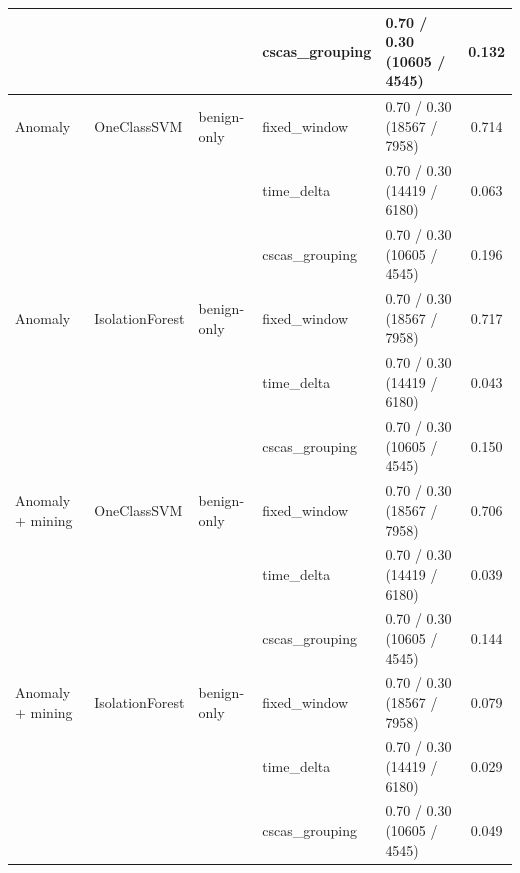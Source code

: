 \begin{table}[htbp]
{\begin{tabular}{lllllc}
 &  &  & cscas\_grouping & 0.70 / 0.30 (10605 / 4545) & 0.132 \\
\midrule
Anomaly & OneClassSVM & benign-only & fixed\_window & 0.70 / 0.30 (18567 / 7958) & 0.714 \\
 &  &  & time\_delta & 0.70 / 0.30 (14419 / 6180) & 0.063 \\
 &  &  & cscas\_grouping & 0.70 / 0.30 (10605 / 4545) & 0.196 \\
\addlinespace
Anomaly & IsolationForest & benign-only & fixed\_window & 0.70 / 0.30 (18567 / 7958) & 0.717 \\
 &  &  & time\_delta & 0.70 / 0.30 (14419 / 6180) & 0.043 \\
 &  &  & cscas\_grouping & 0.70 / 0.30 (10605 / 4545) & 0.150 \\
\addlinespace
Anomaly + mining & OneClassSVM & benign-only & fixed\_window & 0.70 / 0.30 (18567 / 7958) & 0.706 \\
 &  &  & time\_delta & 0.70 / 0.30 (14419 / 6180) & 0.039 \\
 &  &  & cscas\_grouping & 0.70 / 0.30 (10605 / 4545) & 0.144 \\
\addlinespace
Anomaly + mining & IsolationForest & benign-only & fixed\_window & 0.70 / 0.30 (18567 / 7958) & 0.079 \\
 &  &  & time\_delta & 0.70 / 0.30 (14419 / 6180) & 0.029 \\
 &  &  & cscas\_grouping & 0.70 / 0.30 (10605 / 4545) & 0.049 \\
\bottomrule
\end{tabular}%
}
\end{table}